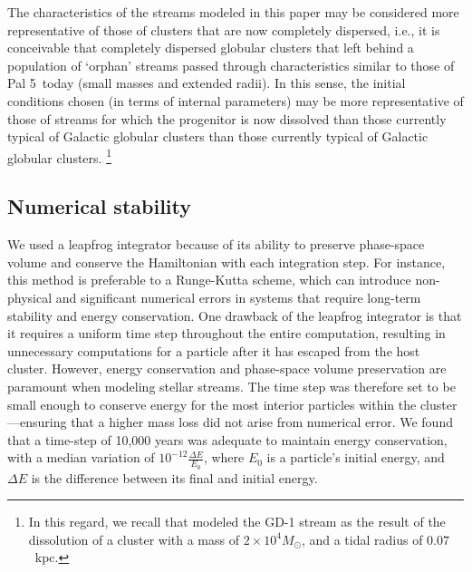         The characteristics of the streams modeled in this paper may be considered more representative of those of clusters that are now completely dispersed, i.e., it is conceivable that completely dispersed globular clusters that left behind a population of `orphan' streams passed through characteristics similar to those of Pal 5~today (small masses and extended radii). In this sense, the initial conditions chosen (in terms of internal parameters) may be more representative of those of streams for which the progenitor is now dissolved \citep[see, for example, the population of streams without progenitors described by][]{2024ApJ...967...89I} than those currently typical of Galactic globular clusters than those currently typical of Galactic globular clusters. \footnote{In this regard, we recall that \citet{2014ApJ...795...95B} modeled the GD-1 stream as the result of the dissolution of a cluster with a mass of $2 \times 10^4 M_\odot$, and a tidal radius of $0.07$~kpc.}


    \subsection{Numerical stability}\label{num_quality}

        We used a leapfrog integrator because of its ability to preserve phase-space volume and conserve the Hamiltonian with each integration step. For instance, this method is preferable to a Runge-Kutta scheme, which can introduce non-physical and significant numerical errors in systems that require long-term stability and energy conservation. One drawback of the leapfrog integrator is that it requires a uniform time step throughout the entire computation, resulting in unnecessary computations for a particle after it has escaped from the host cluster. However, energy conservation and phase-space volume preservation are paramount when modeling stellar streams. The time step was therefore set to be small enough to conserve energy for the most interior particles within the cluster---ensuring that a higher mass loss did not arise from numerical error. We found that a time-step of 10,000 years was adequate to maintain energy conservation, with a median variation of $10^{-12} \frac{\Delta E}{E_0}$, where $E_0$ is a particle's initial energy, and $\Delta E$ is the difference between its final and initial energy. 
    
